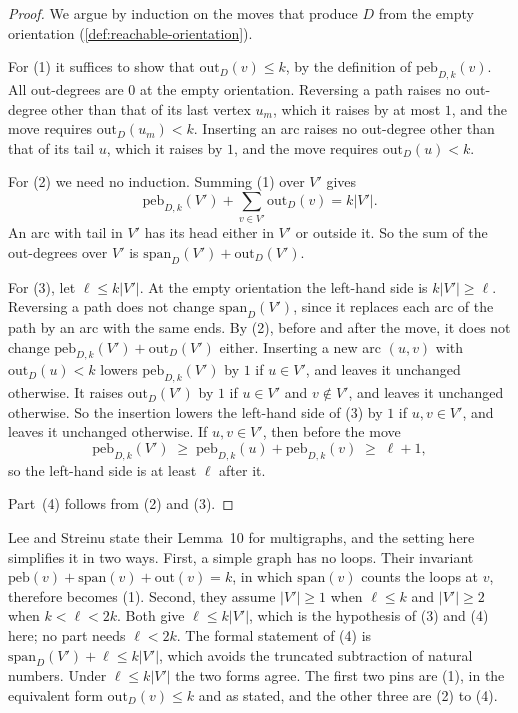 \begin{proof}
  \leanok
  We argue by induction on the moves that produce $D$ from the empty
  orientation (\cref{def:reachable-orientation}).

  For (1) it suffices to show that $\mathrm{out}_D(v) \le k$, by the
  definition of $\mathrm{peb}_{D, k}(v)$. All out-degrees are $0$ at the
  empty orientation. Reversing a path raises no out-degree other than
  that of its last vertex $u_m$, which it raises by at most $1$, and
  the move requires $\mathrm{out}_D(u_m) < k$. Inserting an arc raises
  no out-degree other than that of its tail $u$, which it raises by
  $1$, and the move requires $\mathrm{out}_D(u) < k$.

  For (2) we need no induction. Summing (1) over $V'$ gives
  \[
    \mathrm{peb}_{D, k}(V') + \sum_{v \in V'} \mathrm{out}_D(v) = k|V'|.
  \]
  An arc with tail in $V'$ has its head either in $V'$ or outside it.
  So the sum of the out-degrees over $V'$ is
  $\mathrm{span}_D(V') + \mathrm{out}_D(V')$.

  For (3), let $\ell \le k|V'|$. At the empty orientation the
  left-hand side is $k|V'| \ge \ell$. Reversing a path does not change
  $\mathrm{span}_D(V')$, since it replaces each arc of the path by an
  arc with the same ends. By (2), before and after the move, it does not
  change $\mathrm{peb}_{D, k}(V') + \mathrm{out}_D(V')$ either.
  Inserting a new arc $(u, v)$ with $\mathrm{out}_D(u) < k$ lowers
  $\mathrm{peb}_{D, k}(V')$ by $1$ if $u \in V'$, and leaves it
  unchanged otherwise. It raises
  $\mathrm{out}_D(V')$ by $1$ if $u \in V'$ and $v \notin V'$, and
  leaves it unchanged otherwise. So the insertion lowers the left-hand
  side of (3) by $1$ if $u, v \in V'$, and leaves it unchanged
  otherwise. If $u, v \in V'$, then before the move
  \[
    \mathrm{peb}_{D, k}(V') \;\ge\; \mathrm{peb}_{D, k}(u) +
    \mathrm{peb}_{D, k}(v) \;\ge\; \ell + 1,
  \]
  so the left-hand side is at least $\ell$ after it.

  Part~(4) follows from (2) and (3).
\end{proof}

\begin{fmlnote}
  \label{fmlnote:pebble-game-specialisation}
  Lee and Streinu state their Lemma~10 for multigraphs, and the
  setting here simplifies it in two ways. First, a simple graph has no
  loops. Their invariant $\mathrm{peb}(v) + \mathrm{span}(v) +
  \mathrm{out}(v) = k$, in which $\mathrm{span}(v)$ counts the loops at
  $v$, therefore becomes (1). Second, they assume $|V'| \ge 1$ when
  $\ell \le k$ and $|V'| \ge 2$ when $k < \ell < 2k$. Both give
  $\ell \le k|V'|$, which is the hypothesis of (3) and (4) here; no
  part needs $\ell < 2k$. The formal statement of (4) is
  $\mathrm{span}_D(V') + \ell \le k|V'|$, which avoids the truncated
  subtraction of natural numbers. Under $\ell \le k|V'|$ the two forms
  agree. The first two pins are (1), in
  the equivalent form $\mathrm{out}_D(v) \le k$ and as stated, and the
  other three are (2) to (4).
\end{fmlnote}

